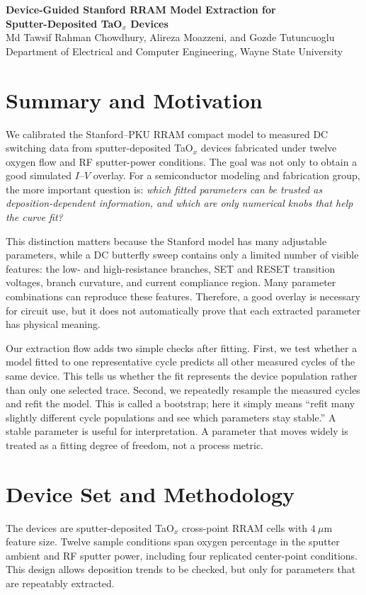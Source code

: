 \documentclass[10pt,letterpaper]{article}
\begin{document}
\fontsize{9.2}{10.6}\selectfont

\begin{center}
{\Large\bfseries Device-Guided Stanford RRAM Model Extraction for\\[-1pt]
Sputter-Deposited TaO$_x$ Devices}\\[3pt]
Md Tawsif Rahman Chowdhury, Alireza Moazzeni, and Gozde Tutuncuoglu\\
Department of Electrical and Computer Engineering, Wayne State University
\end{center}

\section*{Summary and Motivation}
We calibrated the Stanford--PKU RRAM compact model to measured DC switching
data from sputter-deposited TaO$_x$ devices fabricated under twelve oxygen
flow and RF sputter-power conditions.  The goal was not only to obtain a good
simulated $I$--$V$ overlay.  For a semiconductor modeling and fabrication
group, the more important question is: \emph{which fitted parameters can be
trusted as deposition-dependent information, and which are only numerical
knobs that help the curve fit?}

This distinction matters because the Stanford model has many adjustable
parameters, while a DC butterfly sweep contains only a limited number of
visible features: the low- and high-resistance branches, SET and RESET
transition voltages, branch curvature, and current compliance region.  Many
parameter combinations can reproduce these features.  Therefore, a good
overlay is necessary for circuit use, but it does not automatically prove that
each extracted parameter has physical meaning.

Our extraction flow adds two simple checks after fitting.  First, we test
whether a model fitted to one representative cycle predicts all other measured
cycles of the same device.  This tells us whether the fit represents the
device population rather than only one selected trace.  Second, we repeatedly
resample the measured cycles and refit the model.  This is called a
bootstrap; here it simply means ``refit many slightly different cycle
populations and see which parameters stay stable.''  A stable parameter is
useful for interpretation.  A parameter that moves widely is treated as a
fitting degree of freedom, not a process metric.

\section*{Device Set and Methodology}
The devices are sputter-deposited TaO$_x$ cross-point RRAM cells with
\(4~\mu\mathrm{m}\) feature size.  Twelve sample conditions span oxygen
percentage in the sputter ambient and RF sputter power, including four
replicated center-point conditions.  This design allows deposition trends to
be checked, but only for parameters that are repeatably extracted.
\end{document}
